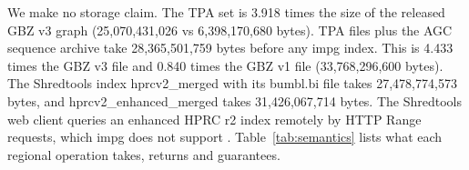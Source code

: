 We make no storage claim.
The TPA set is 3.918 times the size of the released GBZ v3 graph (25,070,431,026 vs 6,398,170,680 bytes).
TPA files plus the AGC sequence archive take 28,365,501,759 bytes before any impg index.
This is 4.433 times the GBZ v3 file and 0.840 times the GBZ v1 file (33,768,296,600 bytes).
The Shredtools index hprcv2\_merged with its bumbl.bi file takes 27,478,774,573 bytes, and hprcv2\_enhanced\_merged takes 31,426,067,714 bytes.
The Shredtools web client queries an enhanced HPRC r2 index remotely by HTTP Range requests, which impg does not support \citep{Shivakumar2026shredtools}.
Table~\ref{tab:semantics} lists what each regional operation takes, returns and guarantees.

